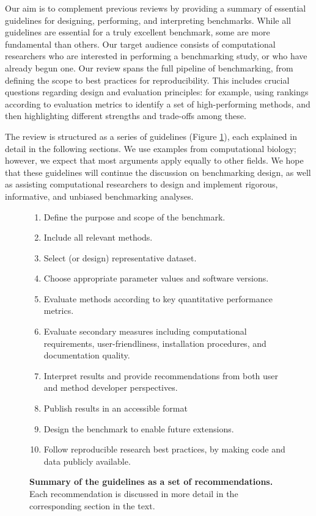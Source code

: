 Our aim is to complement previous reviews by providing a summary of essential guidelines for designing, performing, and interpreting benchmarks. While all guidelines are essential for a truly excellent benchmark, some are more fundamental than others. Our target audience consists of computational researchers who are interested in performing a benchmarking study, or who have already begun one. Our review spans the full pipeline of benchmarking, from defining the scope to best practices for reproducibility. This includes crucial questions regarding design and evaluation principles: for example, using rankings according to evaluation metrics to identify a set of high-performing methods, and then highlighting different strengths and trade-offs among these.

The review is structured as a series of guidelines (Figure \ref{fig:summary_guidelines}), each explained in detail in the following sections. We use examples from computational biology; however, we expect that most arguments apply equally to other fields. We hope that these guidelines will continue the discussion on benchmarking design, as well as assisting computational researchers to design and implement rigorous, informative, and unbiased benchmarking analyses.

\begin{figure}[htb!]
	\centering
	\begin{tcolorbox}
		\begin{enumerate}
			\item Define the purpose and scope of the benchmark.
			\item Include all relevant methods.
			\item Select (or design) representative dataset.
			\item Choose appropriate parameter values and software versions.
			\item Evaluate methods according to key quantitative performance metrics.
			\item Evaluate secondary measures including computational requirements, user-friendliness, installation procedures, and documentation quality.
			\item Interpret results and provide recommendations from both user and method developer perspectives.
			\item Publish results in an accessible format
			\item Design the benchmark to enable future extensions.
			\item Follow reproducible research best practices, by making code and data publicly available.
		\end{enumerate}
  \end{tcolorbox}
	\caption{\textbf{Summary of the guidelines as a set of recommendations.} Each recommendation is discussed in more detail in the corresponding section in the text.}
	\label{fig:summary_guidelines}
\end{figure}

